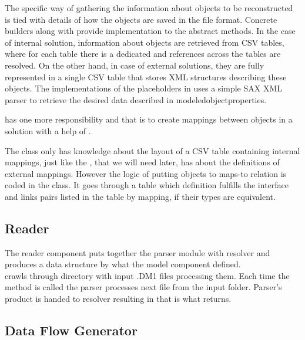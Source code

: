 The specific way of gathering the information about objects to be reconstructed is tied with details of how the objects are saved in the file format. Concrete builders 	 along with  provide implementation to the abstract methods.
In the case of internal solution, information about objects are retrieved from CSV tables, where for each table there is a dedicated and references across the tables are resolved.
On the other hand, in case of external solutions, they are fully represented in a single CSV table that stores XML structures describing these objects. The implementations of the placeholders in  uses a simple SAX XML parser to retrieve the desired data described in modeledobjectproperties.

 has one more responsibility and that is to create mappings between  objects in a solution with a help of . 

The   class only has knowledge about the layout of a CSV table containing internal mappings, just like the , that we will need later, has about the definitions of external mappings. However the logic of putting objects to maps-to relation is coded in the  class.
It goes through a table which definition fulfills the interface  and links pairs listed in the table by mapping, if their types are equivalent.


\subsection{Reader}

The reader component puts together the parser module with resolver and produces a data structure by what the model component defined. \\

 crawls through directory with input .DM1 files processing them. Each time the  method is called the parser processes next file from the input folder. Parser's product is handed to resolver resulting in  that is what  returns.

\subsection{Data Flow Generator}

